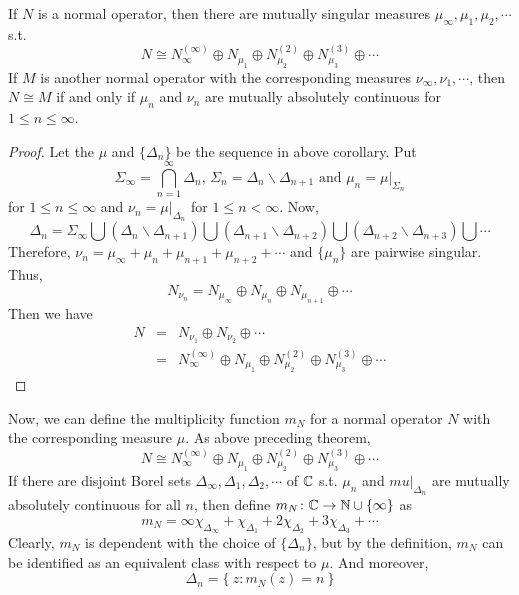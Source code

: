 \documentclass[a4paper,11pt]{report}
\begin{document}
\begin{thm} \label{thm9}
	If $N$ is a normal operator, then there are mutually singular measures $\mu_{\infty}, \mu_1, \mu_2, \cdots$ s.t.
	\begin{equation*}
		N \cong N_{\infty}^{(\infty)} \oplus N_{\mu_1} \oplus N_{\mu_2}^{(2)} \oplus  N_{\mu_3}^{(3)} \oplus \cdots
	\end{equation*}
	If $M$ is another normal operator with the corresponding  measures $\nu_{\infty}, \nu_1, \cdots$, then $N \cong M$ if and only if $\mu_n$ and $\nu_n$ are mutually absolutely continuous for $1 \leqslant n \leqslant \infty$.
\end{thm}
\begin{proof}
	Let the $\mu$ and $\{\Delta_n\}$ be the sequence in above corollary. Put
	\begin{equation*}
		\Sigma_{\infty} = \bigcap_{n=1}^{\infty} \Delta_n \text{, } \Sigma_n = \Delta_n \backslash \Delta_{n+1} \text{ and } \mu_n = \mu|_{\Sigma_n}
	\end{equation*}
	for $1 \leqslant n \leqslant \infty$ and $\nu_n = \mu|_{\Delta_n}$ for $1 \leqslant n < \infty$. Now, 
	\begin{equation*}
		\Delta_n = \Sigma_{\infty} \bigcup (\Delta_n \backslash \Delta_{n+1}) \bigcup (\Delta_{n+1} \backslash \Delta_{n+2}) \bigcup (\Delta_{n+2} \backslash \Delta_{n+3}) \bigcup \cdots
	\end{equation*}
	Therefore, $\nu_n = \mu_{\infty} + \mu_n + \mu_{n+1} + \mu_{n+2} + \cdots$ and $\{\mu_n\}$ are pairwise singular.
	Thus,
	\begin{equation*}
		N_{\nu_n} = N_{\mu_{\infty}} \oplus N_{\mu_n} \oplus N_{\mu_{n+1}} \oplus \cdots
	\end{equation*}
	Then we have
	\begin{eqnarray*}
		N &=& N_{\nu_1} \oplus N_{\nu_2} \oplus \cdots \\
		&=& N_{\infty}^{(\infty)} \oplus N_{\mu_1} \oplus N_{\mu_2}^{(2)} \oplus  N_{\mu_3}^{(3)} \oplus \cdots
	\end{eqnarray*}
\end{proof}

Now, we can define the multiplicity function $m_N$ for a normal operator $N$ with the corresponding measure $\mu$. As above preceding theorem, 
\begin{equation*}
	N \cong N_{\infty}^{(\infty)} \oplus N_{\mu_1} \oplus N_{\mu_2}^{(2)} \oplus  N_{\mu_3}^{(3)} \oplus \cdots
\end{equation*}
If there are disjoint Borel sets $\Delta_{\infty},\Delta_1,\Delta_2,\cdots$ of $\mathbb{C}$ s.t. $\mu_n$ and $mu|_{\Delta_n}$ are mutually absolutely continuous for all $n$, then define
$m_N \colon \mathbb{C} \rightarrow \mathbb{N} \cup \{\infty\}$ as
\begin{equation*}
	m_N = \infty \chi_{\Delta_{\infty}} + \chi_{\Delta_1} + 2\chi_{\Delta_2} + 3\chi_{\Delta_3} + \cdots
\end{equation*}
Clearly, $m_N$ is dependent with the choice of $\{\Delta_n\}$, but by the definition, $m_N$ can be identified as an equivalent class with respect to $\mu$. And moreover,
\begin{equation*}
	\Delta_n = \{~z \colon m_N(z) = n~\}
\end{equation*}
\end{document}
